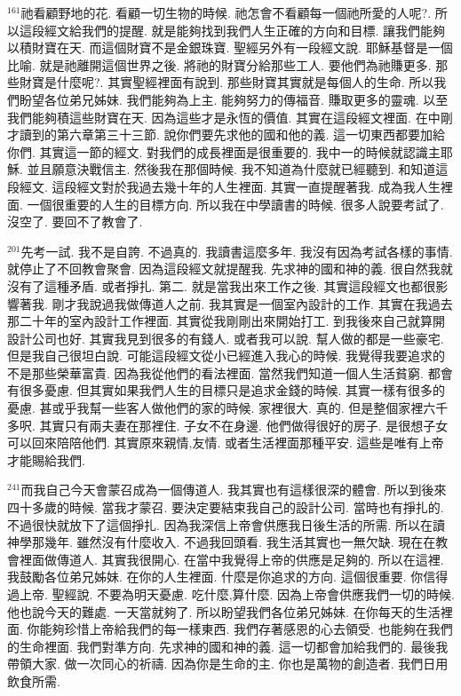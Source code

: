 \documentclass{book}
\begin{document}
$^{161}$祂看顧野地的花.
看顧一切生物的時候.
祂怎會不看顧每一個祂所愛的人呢?.
所以這段經文給我們的提醒.
就是能夠找到我們人生正確的方向和目標.
讓我們能夠以積財寶在天.
而這個財寶不是金銀珠寶.
聖經另外有一段經文說.
耶穌基督是一個比喻.
就是祂離開這個世界之後.
將祂的財寶分給那些工人.
要他們為祂賺更多.
那些財寶是什麼呢?.
其實聖經裡面有說到.
那些財寶其實就是每個人的生命.
所以我們盼望各位弟兄姊妹.
我們能夠為上主.
能夠努力的傳福音.
賺取更多的靈魂.
以至我們能夠積這些財寶在天.
因為這些才是永恆的價值.
其實在這段經文裡面.
在中剛才讀到的第六章第三十三節.
說你們要先求他的國和他的義.
這一切東西都要加給你們.
其實這一節的經文.
對我們的成長裡面是很重要的.
我中一的時候就認識主耶穌.
並且願意決戰信主.
然後我在那個時候.
我不知道為什麼就已經聽到.
和知道這段經文.
這段經文對於我過去幾十年的人生裡面.
其實一直提醒著我.
成為我人生裡面.
一個很重要的人生的目標方向.
所以我在中學讀書的時候.
很多人說要考試了.
沒空了.
要回不了教會了.

$^{201}$先考一試.
我不是自誇.
不過真的.
我讀書這麼多年.
我沒有因為考試各樣的事情.
就停止了不回教會聚會.
因為這段經文就提醒我.
先求神的國和神的義.
很自然我就沒有了這種矛盾.
或者掙扎.
第二.
就是當我出來工作之後.
其實這段經文也都很影響著我.
剛才我說過我做傳道人之前.
我其實是一個室內設計的工作.
其實在我過去那二十年的室內設計工作裡面.
其實從我剛剛出來開始打工.
到我後來自己就算開設計公司也好.
其實我見到很多的有錢人.
或者我可以說.
幫人做的都是一些豪宅.
但是我自己很坦白說.
可能這段經文從小已經進入我心的時候.
我覺得我要追求的不是那些榮華富貴.
因為我從他們的看法裡面.
當然我們知道一個人生活貧窮.
都會有很多憂慮.
但其實如果我們人生的目標只是追求金錢的時候.
其實一樣有很多的憂慮.
甚或乎我幫一些客人做他們的家的時候.
家裡很大.
真的.
但是整個家裡六千多呎.
其實只有兩夫妻在那裡住.
子女不在身邊.
他們做得很好的房子.
是很想子女可以回來陪陪他們.
其實原來親情,友情.
或者生活裡面那種平安.
這些是唯有上帝才能賜給我們.

$^{241}$而我自己今天會蒙召成為一個傳道人.
我其實也有這樣很深的體會.
所以到後來四十多歲的時候.
當我才蒙召.
要決定要結束我自己的設計公司.
當時也有掙扎的.
不過很快就放下了這個掙扎.
因為我深信上帝會供應我日後生活的所需.
所以在讀神學那幾年.
雖然沒有什麼收入.
不過我回頭看.
我生活其實也一無欠缺.
現在在教會裡面做傳道人.
其實我很開心.
在當中我覺得上帝的供應是足夠的.
所以在這裡.
我鼓勵各位弟兄姊妹.
在你的人生裡面.
什麼是你追求的方向.
這個很重要.
你信得過上帝.
聖經說.
不要為明天憂慮.
吃什麼,算什麼.
因為上帝會供應我們一切的時候.
他也說今天的難處.
一天當就夠了.
所以盼望我們各位弟兄姊妹.
在你每天的生活裡面.
你能夠珍惜上帝給我們的每一樣東西.
我們存著感恩的心去領受.
也能夠在我們的生命裡面.
我們對準方向.
先求神的國和神的義.
這一切都會加給我們的.
最後我帶領大家.
做一次同心的祈禱.
因為你是生命的主.
你也是萬物的創造者.
我們日用飲食所需.
\end{document}
